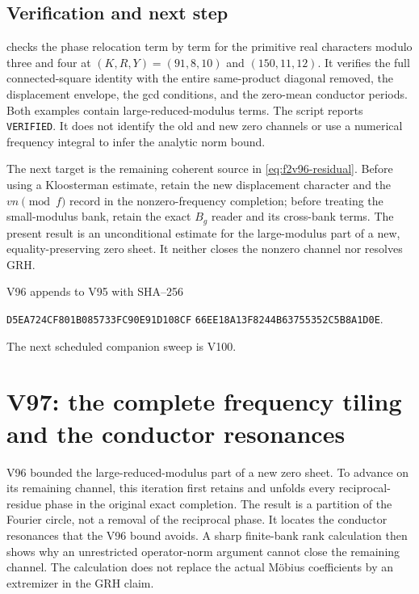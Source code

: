 \documentclass[11pt]{article}
\theoremstyle{definition}
\theoremstyle{remark}
\begin{document}
\subsection*{Verification and next step}

 checks the phase
relocation term by term for the primitive real characters modulo three
and four at \((K,R,Y)=(91,8,10)\) and \((150,11,12)\).
It verifies the full connected-square identity with the entire
same-product diagonal removed, the displacement envelope, the gcd
conditions, and the zero-mean conductor periods.  Both examples contain
large-reduced-modulus terms.  The script reports \texttt{VERIFIED}.
It does not identify the old and new zero channels or use a numerical
frequency integral to infer the analytic norm bound.

The next target is the remaining coherent source in
\eqref{eq:f2v96-residual}.  Before using a Kloosterman estimate, retain
the new displacement character and the \(vn\pmod f\) record in the
nonzero-frequency completion; before treating the small-modulus bank,
retain the exact \(B_g\) reader and its cross-bank terms.  The present
result is an unconditional estimate for the large-modulus part of a
new, equality-preserving zero sheet.  It neither closes the nonzero
channel nor resolves GRH.

V96 appends to V95 with SHA--256
\begin{center}
\texttt{D5EA724CF801B085733FC90E91D108CF}\allowbreak
\texttt{66EE18A13F8244B63755352C5B8A1D0E}.
\end{center}
The next scheduled companion sweep is V100.
\endgroup

\clearpage
\section{V97: the complete frequency tiling and the conductor resonances}
\label{sec:f2v97-frequency-tiling}
\begingroup
\setcounter{equation}{0}
\renewcommand{\theequation}{N97.\arabic{equation}}
\renewcommand{\theHequation}{f2v97.\arabic{equation}}

V96 bounded the large-reduced-modulus part of a new zero sheet.  To
advance on its remaining channel, this iteration first retains and
unfolds every reciprocal-residue phase in the original exact completion.
The result is a partition of the Fourier circle, not a removal of the
reciprocal phase.  It locates the conductor resonances that the V96
bound avoids.  A sharp finite-bank rank calculation then shows why an
unrestricted operator-norm argument cannot close the remaining channel.
The calculation does not replace the actual M\"obius coefficients by
an extremizer in the GRH claim.
\end{document}
